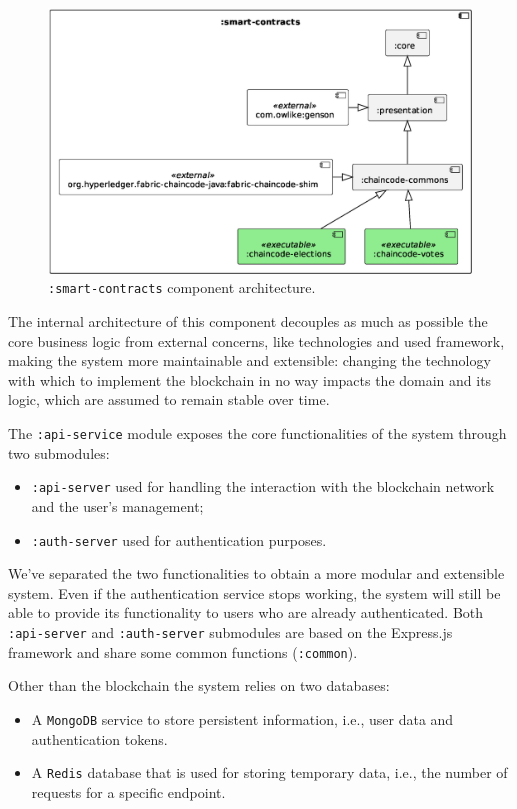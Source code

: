 \documentclass{scrartcl}
\begin{document}
\begin{figure}
    \centering
    \includegraphics[width=0.85\linewidth]{figures/smart-contract-architecture.eps}
    \caption{\texttt{:smart-contracts} component architecture.}
    \label{fig:smart-contract-architecture}
\end{figure}

The internal architecture of this component decouples as much as possible the core business logic from external concerns, like technologies and used framework, making the system more maintainable and extensible: changing the technology with which to implement the blockchain in no way impacts the domain and its logic, which are assumed to remain stable over time.

The \texttt{:api-service} module exposes the core functionalities of the system through two submodules:
\begin{itemize}
    \item \texttt{:api-server} used for handling the interaction with the blockchain network and the user's management;
    \item \texttt{:auth-server} used for authentication purposes. 
\end{itemize}

We've separated the two functionalities to obtain a more modular and extensible system. Even if the authentication service stops working, the system will still be able to provide its functionality to users who are already authenticated.
%
Both \texttt{:api-server} and \texttt{:auth-server} submodules are based on the Express.js framework and share some common functions (\texttt{:common}).

Other than the blockchain the system relies on two databases:
\begin{itemize}
    \item A \texttt{MongoDB} service to store persistent information, i.e., user data and authentication tokens.
    \item A \texttt{Redis} database that is used for storing temporary data, i.e., the number of requests for a specific endpoint.
\end{itemize}
\end{document}
